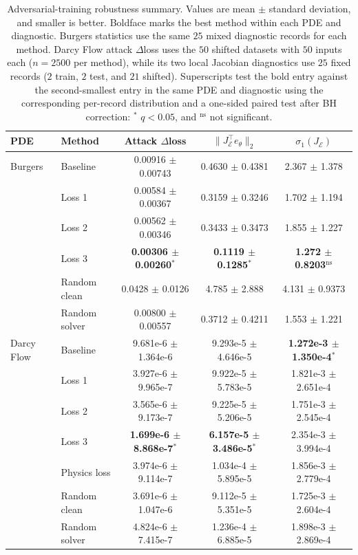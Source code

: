 \documentclass[letterpaper]{article} %
\begin{document}
\begin{table}[t]
\footnotesize
\setlength{\tabcolsep}{3pt}
\renewcommand{\arraystretch}{1.08}
\caption{Adversarial-training robustness summary.  Values are mean \(\pm\)
standard deviation, and smaller is better.  Boldface marks the best method
within each PDE and diagnostic.  Burgers statistics use the same \(25\)
mixed diagnostic records for each method.  Darcy Flow attack \(\Delta\)loss
uses the \(50\) shifted datasets with \(50\) inputs each (\(n=2500\) per
method), while its two local Jacobian diagnostics use \(25\) fixed records
(\(2\) train, \(2\) test, and \(21\) shifted).  Superscripts test the bold
entry against the second-smallest entry in the same PDE and diagnostic using
the corresponding per-record distribution and a one-sided paired test after
BH correction: \(^{*}\) \(q<0.05\), and \(^{\mathrm{ns}}\) not significant.}
\label{tab:adversarial_training_robustness_summary}
\begin{tabular*}{\textwidth}{@{\extracolsep{\fill}}llccc@{}}
\toprule
PDE & Method & Attack \(\Delta\)loss &
\(\|J_{\mathcal E}^{\top}e_\theta\|_2\) & \(\sigma_1(J_{\mathcal E})\) \\
\midrule
Burgers & Baseline & 0.00916 \(\pm\) 0.00743 & 0.4630 \(\pm\) 0.4381 & 2.367 \(\pm\) 1.378 \\
 & Loss 1 & 0.00584 \(\pm\) 0.00367 & 0.3159 \(\pm\) 0.3246 & 1.702 \(\pm\) 1.194 \\
 & Loss 2 & 0.00562 \(\pm\) 0.00346 & 0.3433 \(\pm\) 0.3473 & 1.855 \(\pm\) 1.227 \\
 & Loss 3 & \textbf{0.00306 \(\pm\) 0.00260}\(^{*}\) & \textbf{0.1119 \(\pm\) 0.1285}\(^{*}\) & \textbf{1.272 \(\pm\) 0.8203}\(^{\mathrm{ns}}\) \\
 & Random clean & 0.0428 \(\pm\) 0.0126 & 4.785 \(\pm\) 2.888 & 4.131 \(\pm\) 0.9373 \\
 & Random solver & 0.00800 \(\pm\) 0.00557 & 0.3712 \(\pm\) 0.4211 & 1.553 \(\pm\) 1.221 \\
\midrule
Darcy Flow & Baseline & 9.681e-6 \(\pm\) 1.364e-6 & 9.293e-5 \(\pm\) 4.646e-5 & \textbf{1.272e-3 \(\pm\) 1.350e-4}\(^{*}\) \\
 & Loss 1 & 3.927e-6 \(\pm\) 9.965e-7 & 9.922e-5 \(\pm\) 5.783e-5 & 1.821e-3 \(\pm\) 2.651e-4 \\
 & Loss 2 & 3.565e-6 \(\pm\) 9.173e-7 & 9.225e-5 \(\pm\) 5.206e-5 & 1.751e-3 \(\pm\) 2.545e-4 \\
 & Loss 3 & \textbf{1.699e-6 \(\pm\) 8.868e-7}\(^{*}\) & \textbf{6.157e-5 \(\pm\) 3.486e-5}\(^{*}\) & 2.354e-3 \(\pm\) 3.994e-4 \\
 & Physics loss & 3.974e-6 \(\pm\) 9.114e-7 & 1.034e-4 \(\pm\) 5.895e-5 & 1.856e-3 \(\pm\) 2.779e-4 \\
 & Random clean & 3.691e-6 \(\pm\) 1.047e-6 & 9.112e-5 \(\pm\) 5.351e-5 & 1.725e-3 \(\pm\) 2.604e-4 \\
 & Random solver & 4.824e-6 \(\pm\) 7.415e-7 & 1.236e-4 \(\pm\) 6.885e-5 & 1.898e-3 \(\pm\) 2.869e-4 \\
\bottomrule
\end{tabular*}
\end{table}
\end{document}

